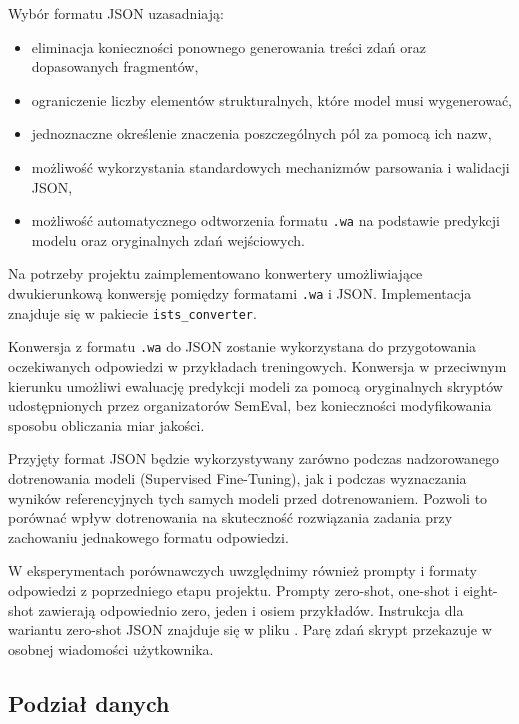 \documentclass[a4paper,10pt]{article}
\begin{document}
Wybór formatu JSON uzasadniają:

\begin{itemize}
    \item eliminacja konieczności ponownego generowania
    treści zdań oraz dopasowanych fragmentów,

    \item ograniczenie liczby elementów strukturalnych,
    które model musi wygenerować,

    \item jednoznaczne określenie znaczenia poszczególnych
    pól za pomocą ich nazw,

    \item możliwość wykorzystania standardowych
    mechanizmów parsowania i walidacji JSON,

    \item możliwość automatycznego odtworzenia formatu
    \texttt{.wa} na podstawie predykcji modelu oraz
    oryginalnych zdań wejściowych.
\end{itemize}

Na potrzeby projektu zaimplementowano konwertery
umożliwiające dwukierunkową konwersję pomiędzy formatami
\texttt{.wa} i JSON. Implementacja znajduje się w pakiecie
\texttt{ists\_converter}.

Konwersja z formatu \texttt{.wa} do JSON zostanie
wykorzystana do przygotowania oczekiwanych odpowiedzi
w przykładach treningowych. Konwersja w przeciwnym
kierunku umożliwi ewaluację predykcji modeli za pomocą
oryginalnych skryptów udostępnionych przez organizatorów
SemEval, bez konieczności modyfikowania sposobu
obliczania miar jakości.

Przyjęty format JSON będzie wykorzystywany zarówno
podczas nadzorowanego dotrenowania modeli
(Supervised Fine-Tuning), jak i podczas wyznaczania
wyników referencyjnych tych samych modeli przed
dotrenowaniem. Pozwoli to porównać wpływ dotrenowania
na skuteczność rozwiązania zadania przy zachowaniu
jednakowego formatu odpowiedzi.

W eksperymentach porównawczych uwzględnimy również
prompty i formaty odpowiedzi z poprzedniego etapu projektu.
Prompty zero-shot, one-shot i eight-shot zawierają
odpowiednio zero, jeden i osiem przykładów. Instrukcja
dla wariantu zero-shot JSON znajduje się w pliku
.
Parę zdań skrypt przekazuje w osobnej wiadomości użytkownika.

\subsection{Podział danych}
\end{document}
